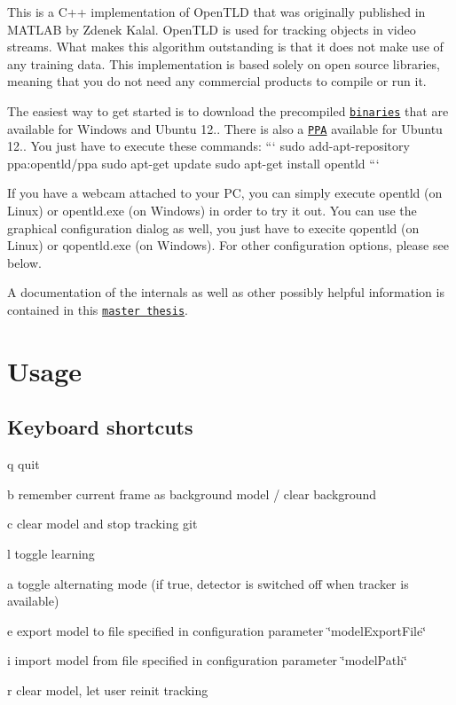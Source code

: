 This is a C++ implementation of Open\-T\-L\-D that was originally published in M\-A\-T\-L\-A\-B by Zdenek Kalal. Open\-T\-L\-D is used for tracking objects in video streams. What makes this algorithm outstanding is that it does not make use of any training data. This implementation is based solely on open source libraries, meaning that you do not need any commercial products to compile or run it.

The easiest way to get started is to download the precompiled \href{https://github.com/gnebehay/OpenTLD/releases}{\tt binaries} that are available for Windows and Ubuntu 12.. There is also a \href{https://launchpad.net/~opentld/+archive/ppa}{\tt P\-P\-A} available for Ubuntu 12.. You just have to execute these commands\-: ``` sudo add-\/apt-\/repository ppa\-:opentld/ppa sudo apt-\/get update sudo apt-\/get install opentld ```

If you have a webcam attached to your P\-C, you can simply execute opentld (on Linux) or opentld.\-exe (on Windows) in order to try it out. You can use the graphical configuration dialog as well, you just have to execite qopentld (on Linux) or qopentld.\-exe (on Windows). For other configuration options, please see below.

A documentation of the internals as well as other possibly helpful information is contained in this \href{https://github.com/downloads/gnebehay/OpenTLD/gnebehay_thesis_msc.pdf}{\tt master thesis}.

\section*{Usage}

\subsection*{Keyboard shortcuts}


\begin{DoxyItemize}
\item {\ttfamily q} quit
\item {\ttfamily b} remember current frame as background model / clear background
\item {\ttfamily c} clear model and stop tracking git
\item {\ttfamily l} toggle learning
\item {\ttfamily a} toggle alternating mode (if true, detector is switched off when tracker is available)
\item {\ttfamily e} export model to file specified in configuration parameter \char`\"{}model\-Export\-File\char`\"{}
\item {\ttfamily i} import model from file specified in configuration parameter \char`\"{}model\-Path\char`\"{}
\item {\ttfamily r} clear model, let user reinit tracking
\end{DoxyItemize}

